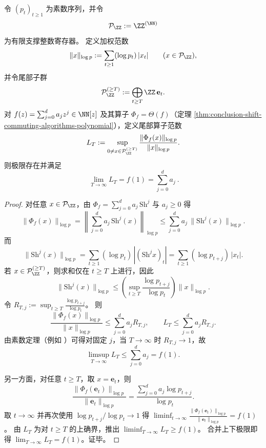 \begin{theorem}\label{thm:conclusion-logp-weighted-tail-operator-norm}
令 \((p_t)_{t\ge 1}\) 为素数序列，并令
\[
\mathcal P_{\ZZ}:=\ZZ^{(\NN)}
\]
为有限支撑整数寄存器。
定义加权范数
\[
\|x\|_{\log p}:=\sum_{t\ge 1}(\log p_t)\,|x_t|
\qquad(x\in\mathcal P_{\ZZ}),
\]
并令尾部子群
\[
\mathcal P_{\ZZ}^{(\ge T)}:=\bigoplus_{t\ge T}\ZZ\,\mathbf e_t.
\]
对 \(f(z)=\sum_{j=0}^{d}a_j z^j\in\NN[z]\) 及其算子 \(\Phi_f=\Theta(f)\)（定理 \ref{thm:conclusion-shift-commuting-algorithms-polynomial}），定义尾部算子范数
\[
L_T:=\sup_{0\neq x\in\mathcal P_{\ZZ}^{(\ge T)}}\frac{\|\Phi_f(x)\|_{\log p}}{\|x\|_{\log p}}.
\]
则极限存在并满足
\[
\boxed{\ \lim_{T\to\infty}L_T=f(1)=\sum_{j=0}^{d}a_j\ }.
\]
\end{theorem}
\begin{proof}
对任意 \(x\in\mathcal P_{\ZZ}\)，由 \(\Phi_f=\sum_{j=0}^d a_j\,\mathrm{Sh}^j\) 与 \(a_j\ge 0\) 得
\[
\|\Phi_f(x)\|_{\log p}
=\left\|\sum_{j=0}^d a_j\,\mathrm{Sh}^j(x)\right\|_{\log p}
\le \sum_{j=0}^d a_j\,\|\mathrm{Sh}^j(x)\|_{\log p}.
\]
而
\[
\|\mathrm{Sh}^j(x)\|_{\log p}
=\sum_{t\ge 1}(\log p_t)\,|(\mathrm{Sh}^j x)_t|
=\sum_{t\ge 1}(\log p_{t+j})\,|x_t|.
\]
若 \(x\in \mathcal P_{\ZZ}^{(\ge T)}\)，则求和仅在 \(t\ge T\) 上进行，因此
\[
\|\mathrm{Sh}^j(x)\|_{\log p}
\le \left(\sup_{t\ge T}\frac{\log p_{t+j}}{\log p_t}\right)\|x\|_{\log p}.
\]
令
\(
R_{T,j}:=\sup_{t\ge T}\frac{\log p_{t+j}}{\log p_t}
\)。
则
\[
\frac{\|\Phi_f(x)\|_{\log p}}{\|x\|_{\log p}}
\le \sum_{j=0}^d a_j R_{T,j},
\qquad
L_T\le \sum_{j=0}^d a_j R_{T,j}.
\]
由素数定理（例如 \cite{Apostol1976}）可得对固定 \(j\)，当 \(T\to\infty\) 时 \(R_{T,j}\to 1\)，故
\[
\limsup_{T\to\infty}L_T\le \sum_{j=0}^d a_j=f(1).
\]
\par
另一方面，对任意 \(t\ge T\)，取 \(x=\mathbf e_t\)，则
\[
\frac{\|\Phi_f(\mathbf e_t)\|_{\log p}}{\|\mathbf e_t\|_{\log p}}
=\frac{\sum_{j=0}^d a_j\log p_{t+j}}{\log p_t}.
\]
取 \(t\to\infty\) 并再次使用 \(\log p_{t+j}/\log p_t\to 1\) 得
\(
\liminf_{t\to\infty}\frac{\|\Phi_f(\mathbf e_t)\|_{\log p}}{\|\mathbf e_t\|_{\log p}}=f(1)
\)。
由 \(L_T\) 为对 \(t\ge T\) 的上确界，推出
\(
\liminf_{T\to\infty}L_T\ge f(1)
\)。
合并上下极限即得 \(\lim_{T\to\infty}L_T=f(1)\)。证毕。
\end{proof}

\endinput

